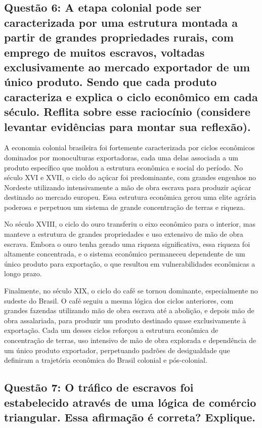 \documentclass[a4paper,12pt]{article}[abntex2]
\begin{document}
\subsection{\textbf{Questão 6: A etapa colonial pode ser caracterizada por uma estrutura montada a partir de grandes propriedades rurais, com emprego de muitos escravos, voltadas exclusivamente ao mercado exportador de um único produto. Sendo que cada produto caracteriza e explica o ciclo econômico em cada século. Reflita sobre esse raciocínio (considere levantar evidências para montar sua reflexão).}}

A economia colonial brasileira foi fortemente caracterizada por ciclos econômicos dominados por monoculturas exportadoras, cada uma delas associada a um produto específico que moldou a estrutura econômica e social do período. No século XVI e XVII, o ciclo do açúcar foi predominante, com grandes engenhos no Nordeste utilizando intensivamente a mão de obra escrava para produzir açúcar destinado ao mercado europeu. Essa estrutura econômica gerou uma elite agrária poderosa e perpetuou um sistema de grande concentração de terras e riqueza.

No século XVIII, o ciclo do ouro transferiu o eixo econômico para o interior, mas manteve a estrutura de grandes propriedades e uso extensivo de mão de obra escrava. Embora o ouro tenha gerado uma riqueza significativa, essa riqueza foi altamente concentrada, e o sistema econômico permaneceu dependente de um único produto para exportação, o que resultou em vulnerabilidades econômicas a longo prazo.

Finalmente, no século XIX, o ciclo do café se tornou dominante, especialmente no sudeste do Brasil. O café seguiu a mesma lógica dos ciclos anteriores, com grandes fazendas utilizando mão de obra escrava até a abolição, e depois mão de obra assalariada, para produzir um produto destinado quase exclusivamente à exportação. Cada um desses ciclos reforçou a estrutura econômica de concentração de terras, uso intensivo de mão de obra explorada e dependência de um único produto exportador, perpetuando padrões de desigualdade que definiram a trajetória econômica do Brasil colonial e pós-colonial.

\subsection{\textbf{Questão 7: O tráfico de escravos foi estabelecido através de uma lógica de comércio triangular. Essa afirmação é correta? Explique.}}
\end{document}
